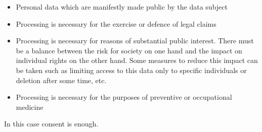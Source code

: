 \begin{itemize}
\begin{itemize}
        \item Personal data which are manifestly made public by the data subject
        \item Processing is necessary for the exercise or defence of legal claims
        \item Processing is necessary for reasons of substantial public interest. There must be a balance between the risk for society on one hand and the impact on individual rights on the other hand. Some measures to reduce this impact can be taken such as limiting access to this data only to specific individuals or deletion after some time, etc.
        \item Processing is necessary for the purposes of preventive or occupational medicine
    \end{itemize}
    In this case consent is enough.
\end{itemize}

